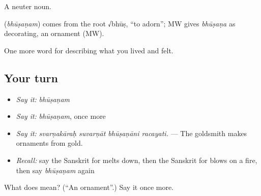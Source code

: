 A neuter noun.

\begin{cousinweb}
\textbf{} (\emph{bhūṣaṇam}) comes from the root √bhūṣ, \textquotedblleft{}to adorn\textquotedblright{}; MW gives \emph{bhūṣaṇa} as decorating, an ornament (MW).
\end{cousinweb}

\begin{grammarlens}[title={What you've built}]
One more word for describing what you lived and felt.
\end{grammarlens}

\subsection*{Your turn}
\begin{itemize}
\raggedright
  \item \emph{Say it:} \emph{bhūṣaṇam}
  \item \emph{Say it:} \emph{bhūṣaṇam}, once more
  \item \emph{Say it:} \emph{svarṇakāraḥ suvarṇāt bhūṣaṇāni racayati.} — The goldsmith makes ornaments from gold.
  \item \emph{Recall:} say the Sanskrit for melts down, then the Sanskrit for blows on a fire, then say \emph{bhūṣaṇam} again
\end{itemize}

\begin{tcolorbox}[breakable,colback=teal!4,colframe=teal!35!black,title={Before you move on}]
What does  mean? (\textquotedblleft{}An ornament\textquotedblright{}.) Say it once more.
\end{tcolorbox}
